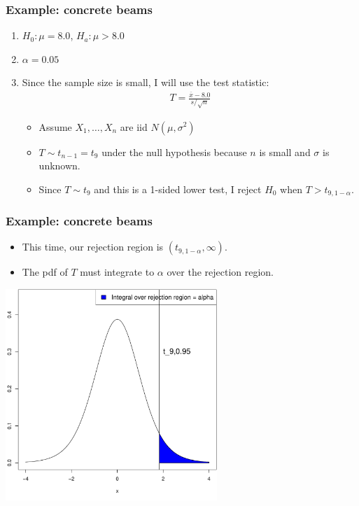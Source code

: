 \documentclass[handout]{beamer}\usepackage[]{graphicx}\usepackage[]{color}
\newenvironment{knitrout}{}{} %
\providecommand{\ov}[1]{\overline{#1}}
\numberwithin{equation}{section}
\begin{document}
\begin{frame}
\frametitle{Example: concrete beams}
\begin{enumerate}[1. ]
\item  $H_0: \mu = 8.0$, $H_a: \mu > 8.0$
\pause \item $\alpha = 0.05$
\pause \item Since the sample size is small, I will use the test statistic:
\begin{align*}
T = \frac{\ov{x} - 8.0}{s/\sqrt{n}}
\end{align*}
\begin{itemize}
\pause \item Assume $X_1, \ldots, X_n$ are iid $N(\mu, \sigma^2)$
\pause \item $T \sim t_{n - 1} = t_{9}$ under the null hypothesis because $n$ is small and $\sigma$ is unknown.
\pause \item Since $T \sim t_9$ and this is a 1-sided lower test, I reject $H_0$ when $T > t_{9, 1-\alpha}$.
\end{itemize}

\end{enumerate}
\end{frame}






\begin{frame}[fragile]
\frametitle{Example: concrete beams}
\begin{itemize}
\item This time, our rejection region is $( t_{9, 1-\alpha}, \infty)$.
\pause \item The pdf of $T$ must integrate to $\alpha$ over the rejection region.
\end{itemize}
\pause \begin{center}
\begin{knitrout}
\color{fgcolor}
\includegraphics[width=0.6\textwidth,height=0.6\textheight]{figure/unnamed-chunk-4-1} 

\end{knitrout}

\end{center}
\end{frame}
\end{document}

